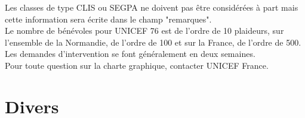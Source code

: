 \documentclass [a4paper] {article}
\begin{document}
Les classes de type CLIS ou SEGPA ne doivent pas être considérées à part mais cette information sera écrite dans le champ "remarques".
\\

Le nombre de bénévoles pour UNICEF 76 est de l'ordre de 10 plaideurs, sur l'ensemble de la Normandie, de l'ordre de 100 et sur la France, de l'ordre de 500.
\\

Les demandes d'intervention se font généralement en deux semaines.
\\

Pour toute question sur la charte graphique, contacter UNICEF France.


\section{Divers}




\newpage
\end{document}
